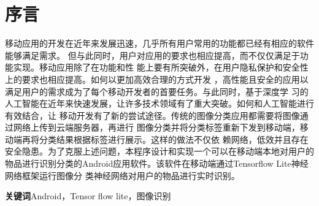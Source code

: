 %
%
%
%

\section{序言}

移动应用的开发在近年来发展迅速，几乎所有用户常用的功能都已经有相应的软件能够满足需求。
但与此同时，用户对应用的要求也相应提高，而不仅仅满足于功能实现。移动应用除了在功能和性
能上要有所突破外，在用户隐私保护和安全性上的要求也相应提高。如何以更加高效合理的方式开发
，高性能且安全的应用以满足用户的需求成为了每个移动开发者的首要任务。与此同时，基于深度学
习的人工智能在近年来快速发展，让许多技术领域有了重大突破。如何和人工智能进行有效结合，让
移动开发有了新的尝试途径。传统的图像分类应用都需要将图像通过网络上传到云端服务器，再进行
图像分类并将分类标签重新下发到移动端，移动端再将分类结果根据标签进行展示。这样的做法不仅依
赖网络，低效并且存在安全隐患。为了克服上述问题，本程序设计和实现一个可以在移动端本地对用户的
物品进行识别分类的Android应用软件。该软件在移动端通过Tensorflow Lite神经网络框架运行图像分
类神经网络对用户的物品进行实时识别。

\textbf{关键词}\hspace{1em}Android，Tensor flow lite，图像识别
